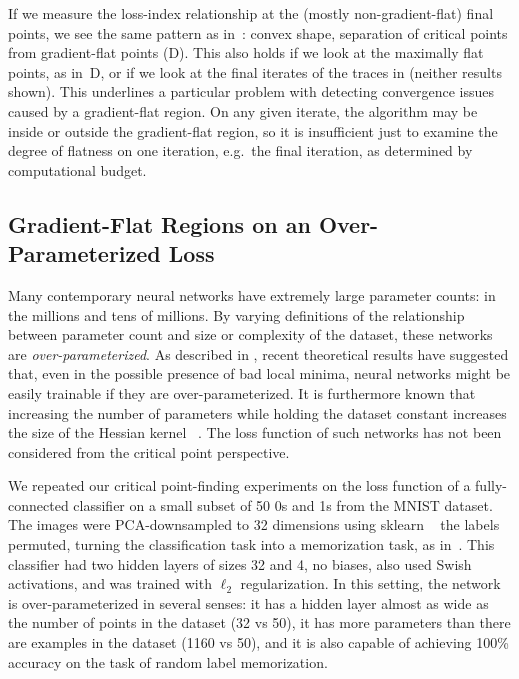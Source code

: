 \documentclass[../../thesis.tex]{subfiles}
\begin{document}
If we measure the loss-index relationship at the
(mostly non-gradient-flat) final points,
we see the same pattern as in~:
convex shape, separation of critical points from gradient-flat points
(D).
This also holds if we look at the maximally flat points,
as in~D,
or if we look at the final iterates
of the traces in 
(neither results shown).
This underlines a particular problem with detecting
convergence issues caused by a gradient-flat region.
On any given iterate, the algorithm may be inside
or outside the gradient-flat region,
so it is insufficient just to examine the degree of flatness
on one iteration,
e.g.~the final iteration, as determined by computational budget.

\subsection{Gradient-Flat Regions on an Over-Parameterized Loss}

Many contemporary neural networks have extremely large parameter counts:
in the millions and tens of millions.
By varying definitions of the relationship
between parameter count and size or complexity of the dataset,
these networks are \emph{over-parameterized}.
As described in ,
recent theoretical results have suggested that,
even in the possible presence of bad local minima,
neural networks might be easily trainable if they are over-parameterized.
It is furthermore known that increasing the number of parameters
while holding the dataset constant increases the size of the Hessian kernel%
~\cite{sagun2017}.
The loss function of such networks has not been considered from the
critical point perspective.

We repeated our critical point-finding experiments
on the loss function of a fully-connected classifier on a small subset
of 50 0s and 1s from the MNIST dataset.
The images were PCA-downsampled to 32 dimensions using sklearn%
~\cite{pedregosa2011}
the labels permuted, turning the classification task
into a memorization task,
as in~\cite{zhang2016}.
This classifier had two hidden layers of sizes 32 and 4,
no biases, also used Swish activations,
and was trained with $\ell_2$ regularization.
In this setting, the network is over-parameterized in several senses:
it has a hidden layer almost as wide as the number of points in the dataset (32 vs 50),
it has more parameters than there are examples in the dataset (1160 vs 50),
and it is also capable of achieving 100\% accuracy
on the task of random label memorization.
\end{document}
